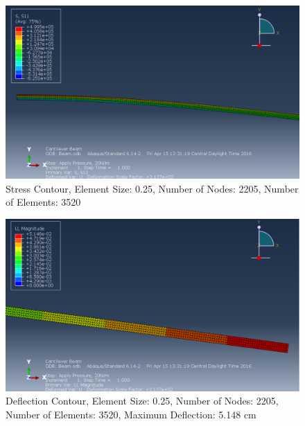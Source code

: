 \documentclass[a4paper]{article}
\begin{document}
\begin{figure}[ht]
\centering
\includegraphics[scale=.50]{3Nsize0_25Stress.PNG}
\caption{Stress Contour, Element Size: 0.25, Number of Nodes: 2205, Number of Elements: 3520}
\end{figure}
\begin{figure}[ht]
\centering
\includegraphics[scale=.50]{3Nsize0_25MDisplacement.PNG}
\caption{Deflection Contour, Element Size: 0.25, Number of Nodes: 2205, Number of Elements: 3520, Maximum Deflection: 5.148 cm}
\end{figure}
\end{document}
